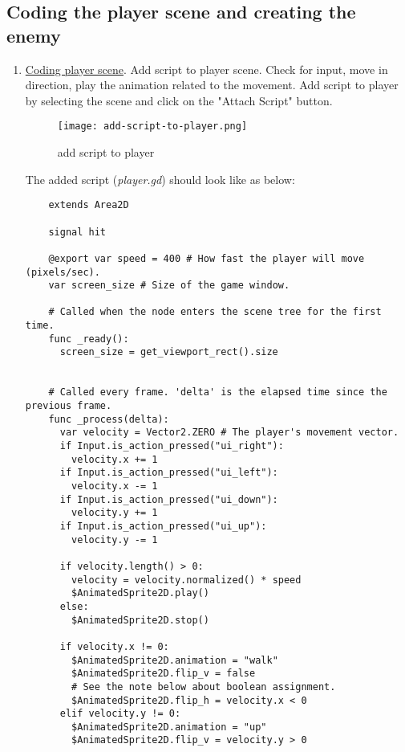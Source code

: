 \subsection{Coding the player scene and creating the enemy}
\begin{enumerate}[resume]
  \item \href{https://docs.godotengine.org/en/stable/getting_started/first_2d_game/03.coding_the_player.html}{\color{blue}Coding player scene}. 
  Add script to player scene. Check for input, move in direction, play the animation related
  to the movement.
  Add script to player by selecting the scene and click on the "Attach Script" button.
  \begin{figure}[H]
    \centering
    \texttt{[image: add-script-to-player.png]}
      \caption{add script to player}
      \label{fig:add-script-to-player}
  \end{figure}
  The added script (\textit{player.gd}) should look like as below:
  \begin{verbatim}
    extends Area2D

    signal hit

    @export var speed = 400 # How fast the player will move (pixels/sec).
    var screen_size # Size of the game window.
    
    # Called when the node enters the scene tree for the first time.
    func _ready():
      screen_size = get_viewport_rect().size
    
    
    # Called every frame. 'delta' is the elapsed time since the previous frame.
    func _process(delta):
      var velocity = Vector2.ZERO # The player's movement vector.
      if Input.is_action_pressed("ui_right"):
        velocity.x += 1
      if Input.is_action_pressed("ui_left"):
        velocity.x -= 1
      if Input.is_action_pressed("ui_down"):
        velocity.y += 1
      if Input.is_action_pressed("ui_up"):
        velocity.y -= 1
    
      if velocity.length() > 0:
        velocity = velocity.normalized() * speed
        $AnimatedSprite2D.play()
      else:
        $AnimatedSprite2D.stop()
      
      if velocity.x != 0:
        $AnimatedSprite2D.animation = "walk"
        $AnimatedSprite2D.flip_v = false
        # See the note below about boolean assignment.
        $AnimatedSprite2D.flip_h = velocity.x < 0
      elif velocity.y != 0:
        $AnimatedSprite2D.animation = "up"
        $AnimatedSprite2D.flip_v = velocity.y > 0
      

\end{verbatim}
\end{enumerate}
